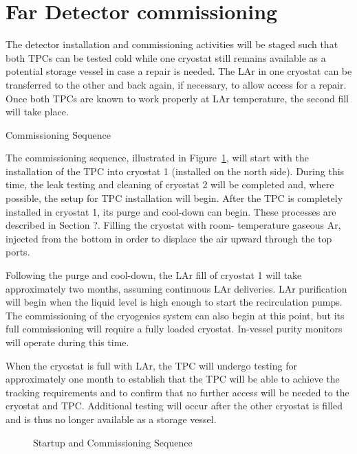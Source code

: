 \section{Far Detector commissioning}
\label{fd:install:commissioning}

The detector installation and commissioning activities will be staged such that both TPCs can be tested cold while one cryostat still remains available as a potential storage vessel in case a repair is needed. The LAr in one cryostat can be transferred to the other and back again, if necessary, to allow access for a repair. Once both TPCs are known to work properly at LAr temperature, the second fill will take place. 

Commissioning Sequence

The commissioning sequence, illustrated in Figure~\ref{fig:tpc-install-commissioning-seq}, will start with the installation of the TPC into cryostat 1 (installed on the north side). During this time, the leak testing and cleaning of cryostat 2 will be completed and, 
where possible, the setup for TPC installation will begin. After the TPC is completely installed in cryostat 1, its purge and cool-down can begin. These processes are described in Section ?. Filling the cryostat with room-
temperature gaseous Ar, injected from the bottom in order to displace the air upward through the top ports. 

Following the purge and cool-down, the LAr fill of cryostat 1 will take approximately two months, assuming continuous LAr deliveries. LAr purification will begin when the liquid level is high enough to start the recirculation 
pumps. The commissioning of the cryogenics system can also begin at this point, but its full commissioning will require a fully loaded cryostat. In-vessel purity monitors will operate during this time. 

When the cryostat is full with LAr, the TPC will undergo testing for approximately one month to establish that the TPC will be able to achieve the tracking requirements and to confirm that no further access will be needed to the 
cryostat and TPC. Additional testing will occur after the other cryostat is filled and is thus no longer available as a storage vessel. 

\begin{figure}[htbp]
\centering
\caption{Startup and Commissioning Sequence} 
\label{fig:tpc-install-commissioning-seq}
\end{figure}

